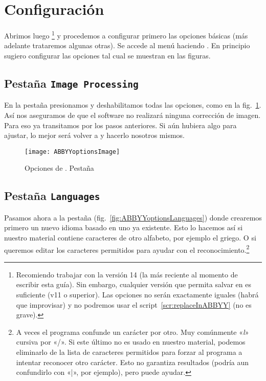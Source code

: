 \documentclass[%
	a5paper,
	10pt,
	twoside,
	openright,
	final,
]{memoir}
\begin{document}
{	\section{Configuración} Abrimos luego \abbyy\footnote{Recomiendo trabajar con la versión 14 (la más reciente al momento de escribir esta guía). Sin embargo, cualquier versión que permita salvar en \djvu es suficiente (v11 o superior). Las opciones no serán exactamente iguales (habrá que improvisar) y no podremos usar el script~\ref{scr:replaceInABBYY} (no es grave).} y procedemos a configurar primero las opciones básicas (más adelante trataremos algunas otras). Se accede al menú haciendo . En principio sugiero configurar las opciones tal cual se muestran en las figuras.

	\subsection{Pestaña \texttt{Image Processing}} En la pestaña  presionamos  y deshabilitamos todas las opciones, como en la fig.~\ref{fig:ABBYYoptionsImage}. Así nos aseguramos de que el software no realizará ninguna corrección de imagen. Para eso ya transitamos por los pasos anteriores. Si aún hubiera algo para ajustar, lo mejor será volver a \scantailor y hacerlo nosotros mismos.

	\begin{figure}
		\centering
		\texttt{[image: ABBYYoptionsImage]}
		\caption[Opciones de \abbyy. Pestaña \texttt{Image Processing}]{Opciones de \abbyy. Pestaña \label{fig:ABBYYoptionsImage}}
	\end{figure}

	\subsection{Pestaña \texttt{Languages}} Pasamos ahora a la pestaña  (fig.~\ref{fig:ABBYYoptionsLanguages}) donde crearemos primero un nuevo idioma basado en uno ya existente. Esto lo hacemos así si nuestro material contiene caracteres de otro alfabeto, por ejemplo el griego. O si queremos editar los caracteres permitidos para ayudar con el reconocimiento.\footnote{A veces el programa confunde un carácter por otro. Muy comúnmente «\textit{l}» cursiva por «/». Si este último no es usado en nuestro material, podemos eliminarlo de la lista de caracteres permitidos para forzar al programa a intentar reconocer otro carácter. Esto no garantiza resultados (podría aun confundirlo con «|», por ejemplo), pero puede ayudar.}

}
\end{document}
